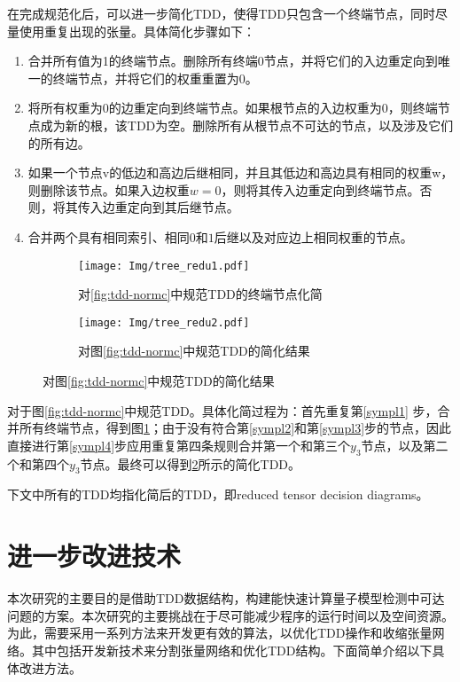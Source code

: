 在完成规范化后，可以进一步简化TDD，使得TDD只包含一个终端节点，同时尽量使用重复出现的张量。具体简化步骤如下：
\begin{enumerate}
    \item 	合并所有值为1的终端节点。删除所有终端$0$节点，并将它们的入边重定向到唯一的终端节点，并将它们的权重重置为$0$。\label{sympl1}
	\item 将所有权重为$0$的边重定向到终端节点。如果根节点的入边权重为$0$，则终端节点成为新的根，该TDD为空。删除所有从根节点不可达的节点，以及涉及它们的所有边。\label{sympl2}
	\item 如果一个节点v的低边和高边后继相同，并且其低边和高边具有相同的权重w，则删除该节点。如果入边权重$w=0$，则将其传入边重定向到终端节点。否则，将其传入边重定向到其后继节点。\label{sympl3}
	\item 合并两个具有相同索引、相同$0$和$1$后继以及对应边上相同权重的节点。\label{sympl4}
\end{enumerate}

\begin{figure}[!htbp]
    \centering
    \begin{subfigure}[b]{0.4\textwidth}
        \centering
        \texttt{[image: Img/tree\_redu1.pdf]}
        \caption{对\ref{fig:tdd-normc}中规范TDD的终端节点化简}
        \label{fig:tdd-redu1}
    \end{subfigure}
    \begin{subfigure}[b]{0.4\textwidth}
        \centering
        \texttt{[image: Img/tree\_redu2.pdf]}
        \caption{对图\ref{fig:tdd-normc}中规范TDD的简化结果}
        \label{fig:tdd-redu2}
    \end{subfigure}
    \label{fig:tdd-redu}
\end{figure}

对于图\ref{fig:tdd-normc}中规范TDD。具体化简过程为：首先重复第\ref{sympl1} 步，合并所有终端节点，得到图\ref{fig:tdd-redu1}；由于没有符合第\ref{sympl2}和第\ref{sympl3}步的节点，因此直接进行第\ref{sympl4}步应用重复第四条规则合并第一个和第三个$y_3$节点，以及第二个和第四个$y_3$节点。最终可以得到\ref{fig:tdd-redu2}所示的简化TDD。

下文中所有的TDD均指化简后的TDD，即reduced tensor decision diagrams。
\section{进一步改进技术}
本次研究的主要目的是借助TDD数据结构，构建能快速计算量子模型检测中可达问题的方案。本次研究的主要挑战在于尽可能减少程序的运行时间以及空间资源。为此，需要采用一系列方法来开发更有效的算法，以优化TDD操作和收缩张量网络。其中包括开发新技术来分割张量网络和优化TDD结构。下面简单介绍以下具体改进方法。

